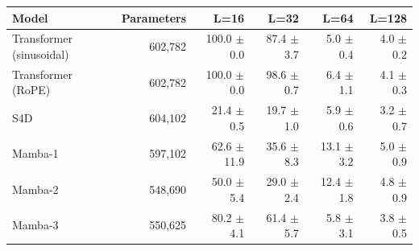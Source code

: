 \begin{tabular}{lrrrrr}
\toprule
Model & Parameters & L=16 & L=32 & L=64 & L=128 \\
\midrule
Transformer (sinusoidal) & 602,782 & 100.0 $\pm$ 0.0 & 87.4 $\pm$ 3.7 & 5.0 $\pm$ 0.4 & 4.0 $\pm$ 0.2 \\
Transformer (RoPE) & 602,782 & 100.0 $\pm$ 0.0 & 98.6 $\pm$ 0.7 & 6.4 $\pm$ 1.1 & 4.1 $\pm$ 0.3 \\
S4D & 604,102 & 21.4 $\pm$ 0.5 & 19.7 $\pm$ 1.0 & 5.9 $\pm$ 0.6 & 3.2 $\pm$ 0.7 \\
Mamba-1 & 597,102 & 62.6 $\pm$ 11.9 & 35.6 $\pm$ 8.3 & 13.1 $\pm$ 3.2 & 5.0 $\pm$ 0.9 \\
Mamba-2 & 548,690 & 50.0 $\pm$ 5.4 & 29.0 $\pm$ 2.4 & 12.4 $\pm$ 1.8 & 4.8 $\pm$ 0.9 \\
Mamba-3 & 550,625 & 80.2 $\pm$ 4.1 & 61.4 $\pm$ 5.7 & 5.8 $\pm$ 3.1 & 3.8 $\pm$ 0.5 \\
\bottomrule
\end{tabular}
\par{}
